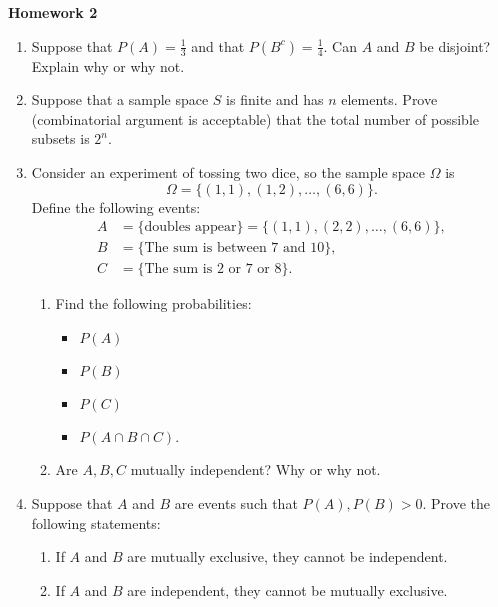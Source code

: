 \documentclass[10pt,twoside]{article}\usepackage[]{graphicx}\usepackage[dvipsnames,svgnames,table]{xcolor}
\begin{document}
\begin{flushright}
\begin{minipage}{.33\textwidth}
\rightline{\today}
\end{minipage}
\end{flushright}

\begin{center}
{\large{\textbf{Homework 2}}}
\end{center}

\begin{enumerate}
    \item Suppose that $P(A) = \frac{1}{3}$ and that $P(B^c) = \frac{1}{4}$. Can $A$ and $B$ be disjoint? Explain why or why not.
    \item Suppose that a sample space $S$ is finite and has $n$ elements. Prove (combinatorial argument is acceptable) that the total number of possible subsets is $2^n$. 
    \item Consider an experiment of tossing two dice, so the sample space $\Omega$ is
    $$
    \Omega = \{(1, 1), (1, 2), \ldots, (6, 6)\}.
    $$
    Define the following events:
    \begin{align*}
      A &= \{\text{doubles appear}\} = \{(1, 1), (2, 2), \ldots, (6, 6)\},\\
      B &= \{\text{The sum is between 7 and 10}\}, \\
      C &= \{\text{The sum is 2 or 7 or 8}\}.
    \end{align*}
    \begin{enumerate}
      \item Find the following probabilities:
      \begin{itemize}
          \item $P(A)$
          \item $P(B)$
          \item $P(C)$
          \item $P(A \cap B \cap C)$.
      \end{itemize}
      \item Are $A, B, C$ mutually independent? Why or why not.
    \end{enumerate}
    \item Suppose that $A$ and $B$ are events such that $P(A), P(B) > 0$. Prove the following statements:
    \begin{enumerate}
      \item If $A$ and $B$ are mutually exclusive, they cannot be independent.
      \item If $A$ and $B$ are independent, they cannot be mutually exclusive.
    \end{enumerate}
    

\end{enumerate}
\end{document}
